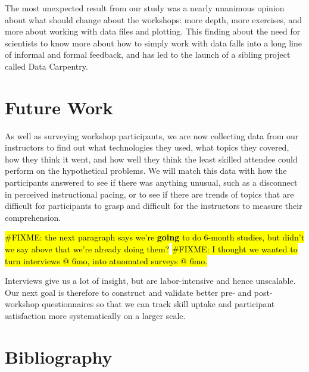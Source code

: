 \documentclass[submission,copyright,creativecommons]{eptcs}
\newcommand{\fixme}[1]{\hl{\#FIXME: #1}}
\begin{document}
The most unexpected result from our study was a nearly unanimous opinion about what should change about the workshops:
more depth,
more exercises,
and more about working with data files and plotting.
This finding about the need for scientists to know more about how to simply work with data
falls into a long line of informal and formal feedback,
and has led to the launch of a sibling project called Data Carpentry.

\section{Future Work}

As well as surveying workshop participants,
we are now collecting data from our instructors
to find out what technologies they used,
what topics they covered,
how they think it went,
and how well they think the least skilled attendee could perform on the hypothetical problems.
We will match this data with how the participants answered to see if there was anything unusual,
such as a disconnect in perceived instructional pacing,
or to see if there are trends of topics that are difficult for participants to grasp
and difficult for the instructors to measure their comprehension.

\fixme{the next paragraph says we're \textbf{going} to do 6-month studies, but didn't we say above that we're already doing them?}
\fixme{I thought we wanted to turn interviews @ 6mo, into atuomated surveys @ 6mo.}

Interviews give us a lot of insight,
but are labor-intensive and hence unscalable.
Our next goal is therefore to construct and validate better pre- and post-workshop questionnaires
so that we can track skill uptake and participant satisfaction
more systematically on a larger scale.

\section{Bibliography}


\nocite{*}


\end{document}

